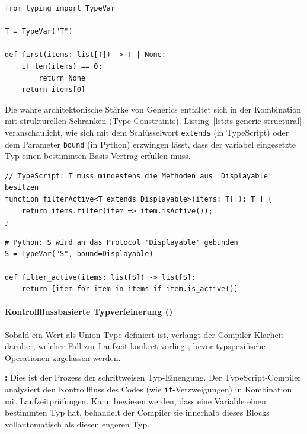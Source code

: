 \begin{listing}[htbp]
    \caption{Eine generische Funktion in Python}
    \label{lst:python-generic-first}
    \begin{verbatim}
from typing import TypeVar

T = TypeVar("T")

def first(items: list[T]) -> T | None:
    if len(items) == 0:
        return None
    return items[0]
    \end{verbatim}
\end{listing}

Die wahre architektonische Stärke von Generics entfaltet sich in der Kombination mit strukturellen Schranken (Type Constraints). Listing~\ref{lst:ts-generic-structural} veranschaulicht, wie sich mit dem Schlüsselwort \texttt{extends} (in TypeScript) oder dem Parameter \texttt{bound} (in Python) erzwingen lässt, dass der variabel eingesetzte Typ einen bestimmten Basis-Vertrag erfüllen muss.

\begin{listing}[htbp]
    \caption{Generics mit strukturellen Schranken im Vergleich}
    \label{lst:ts-generic-structural}
    \begin{verbatim}
// TypeScript: T muss mindestens die Methoden aus 'Displayable' besitzen
function filterActive<T extends Displayable>(items: T[]): T[] {
    return items.filter(item => item.isActive());
}
    \end{verbatim}
        
    \begin{verbatim}
# Python: S wird an das Protocol 'Displayable' gebunden
S = TypeVar("S", bound=Displayable)

def filter_active(items: list[S]) -> list[S]:
    return [item for item in items if item.is_active()]
    \end{verbatim}
\end{listing}


\paragraph{Kontrollflussbasierte Typverfeinerung ()}
\label{par:type-narrowing}

Sobald ein Wert als Union Type definiert ist, verlangt der Compiler Klarheit darüber, welcher Fall zur Laufzeit konkret vorliegt, bevor typspezifische Operationen zugelassen werden. 

\begin{definition}
\label{def:ts-type-narrowing}
\textbf{:} Dies ist der Prozess der schrittweisen Typ-Einengung. Der TypeScript-Compiler analysiert den Kontrollfluss des Codes (wie \texttt{if}-Verzweigungen) in Kombination mit Laufzeitprüfungen. Kann bewiesen werden, dass eine Variable einen bestimmten Typ hat, behandelt der Compiler sie innerhalb dieses Blocks vollautomatisch als diesen engeren Typ.
\end{definition}

